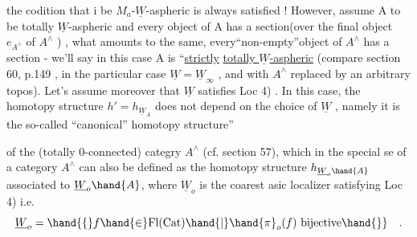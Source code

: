 
the codition that i be $M_a$-$\underline{W}$-aspheric is always satisfied !\hand{)} However,
 assume A to be totally $\underline{W}$-aspheric and every object of A has a
section(over the final object $e_{A^{\wedge}}$ of $A^{\wedge}$ ) , what amounts to the
same, every``non-empty''\hand{/}object of $A^{\wedge}$ has a section - 
 we'll say in this case A is ``\uline{strictly}  \uline{totally $\underline{W}$-aspheric}
(compare section 60, p.149 , in the particular case $\underline{W} = \underline{W}_{\infty}$ , and
with $A^{\wedge}$ replaced by an arbitrary topos). Let's assume moreover that
$\underline{W}$ satisfies Loc 4) . In this case, the homotopy structure $h' = h_{\underline{W}_A}$
does not depend on the choice of $\underline{W}$ , namely it is the so-called
``canonical'' homotopy structure''  of the  (totally 0-connected)
categry $A^{\wedge}$ (cf. section 57), which in the special se of a category
$A^{\wedge}$ can also be defined as the homotopy structure $h_{\underline{W}_o\hand{A}}$ associated to
$\underline{W}_o\hand{A}$, where $\underline{W}_o$ is the coarest asic localizer satisfying Loc 4) i.e.
\[ \underline{W}_o = \hand{\{} f \hand{\in} \mathrm{Fl}(\mathrm{Cat}) \hand{|} \hand{\pi}_o(f) \text{ bijective}\hand{\}} \quad . \]
